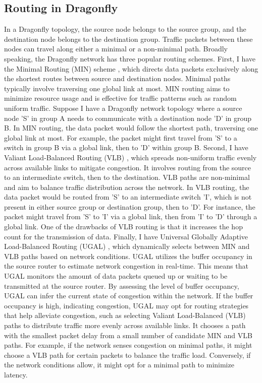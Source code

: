 \subsection{Routing in Dragonfly}
In a Dragonfly topology, the source node belongs to the source group, and the destination node belongs to the destination group. Traffic packets between these nodes can travel along either a minimal or a non-minimal path. Broadly speaking, the Dragonfly network has three popular routing schemes.
First, I have the Minimal Routing (MIN) scheme \cite{kim2008technology}, which directs data packets exclusively along the shortest routes between source and destination nodes. Minimal paths typically involve traversing one global link at most. MIN routing aims to minimize resource usage and is effective for traffic patterns such as random uniform traffic. Suppose I have a Dragonfly network topology where a source node 'S' in group A needs to communicate with a destination node 'D' in group B. In MIN routing, the data packet would follow the shortest path, traversing one global link at most. For example, the packet might first travel from 'S' to a switch in group B via a global link, then to 'D' within group B.
Second, I have Valiant Load-Balanced Routing (VLB) \cite{kim2008technology, kaplan2017unveiling}, which spreads non-uniform traffic evenly across available links to mitigate congestion. It involves routing from the source to an intermediate switch, then to the destination. VLB paths are non-minimal and aim to balance traffic distribution across the network. In VLB routing, the data packet would be routed from 'S' to an intermediate switch 'I', which is not present in either source group or destination group, then to 'D'. For instance, the packet might travel from 'S' to 'I' via a global link, then from 'I' to 'D' through a global link. One of the drawbacks of VLB routing is that it increases the hop count for the transmission of data.
Finally, I have Universal Globally Adaptive Load-Balanced Routing (UGAL) \cite{kim2008technology, kaplan2017unveiling}, which dynamically selects between MIN and VLB paths based on network conditions. UGAL utilizes the buffer occupancy in the source router to estimate network congestion in real-time. This means that UGAL monitors the amount of data packets queued up or waiting to be transmitted at the source router. By assessing the level of buffer occupancy, UGAL can infer the current state of congestion within the network. If the buffer occupancy is high, indicating congestion, UGAL may opt for routing strategies that help alleviate congestion, such as selecting Valiant Load-Balanced (VLB) paths to distribute traffic more evenly across available links. It chooses a path with the smallest packet delay from a small number of candidate MIN and VLB paths. For example, if the network senses congestion on minimal paths, it might choose a VLB path for certain packets to balance the traffic load. Conversely, if the network conditions allow, it might opt for a minimal path to minimize latency.




